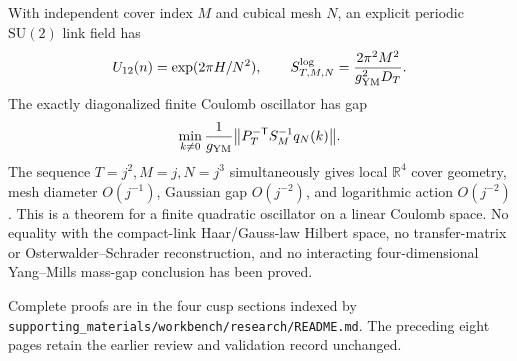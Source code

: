 {\ResultSmall
With independent cover index \(M\) and cubical mesh \(N\), an explicit
periodic \(\mathrm{SU}(2)\) link field has
\[
 U_{12}(n)=\exp(2\pi H/N^2),\qquad
 S^{\log}_{T,M,N}=\frac{2\pi^2M^2}{g_{\rm YM}^2D_T}.
\]
The exactly diagonalized finite Coulomb oscillator has gap
\[
 \min_{k\ne0}\frac1{g_{\rm YM}}
 \bigl\lVert P_T^{-\mathsf T}S_M^{-1}q_N(k)\bigr\rVert.
\]
The sequence \(T=j^2,M=j,N=j^3\) simultaneously gives local
\(\mathbb R^4\) cover geometry, mesh diameter \(O(j^{-1})\), Gaussian gap
\(O(j^{-2})\), and logarithmic action \(O(j^{-2})\).  This is a theorem for
a finite quadratic oscillator on a linear Coulomb space.  No equality with
the compact-link Haar/Gauss-law Hilbert space, no transfer-matrix or
Osterwalder--Schrader reconstruction, and no interacting four-dimensional
Yang--Mills mass-gap conclusion has been proved.
}

\vfill
{\fontsize{6.25pt}{7.1pt}\selectfont\color{AuditProvenance}
Complete proofs are in the four cusp sections indexed by
\nolinkurl{supporting_materials/workbench/research/README.md}.  The preceding
eight pages retain the earlier review and validation record unchanged.}
\endgroup
